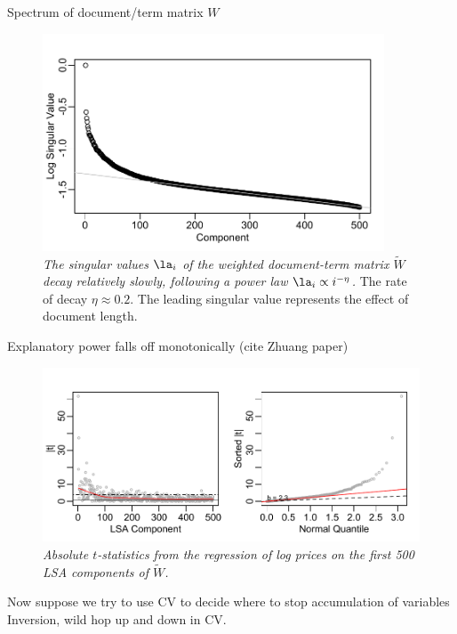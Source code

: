 \documentclass[12pt]{article}
\begin{document}
Spectrum of document/term matrix $W$

 \begin{figure}
 \caption{ 
 	\label{fig:spectrum}
	{\sl The singular values $\la_i$ of the weighted document-term matrix
 $\widetilde{W}$ decay relatively slowly, following a power law $\la_i \propto
 i^{-\eta}$.  } The rate of decay $\eta \approx 0.2$. The leading singular value
 represents the effect of document length. }

 \vspace{0.1in}
 \centerline{   \includegraphics[width=4in]{figures/spectrum} }
 \vspace{0.2in}
 \end{figure}
   

Explanatory power falls off monotonically (cite Zhuang paper)

\begin{figure}
\caption{  \label{fig:lsatstats}  
  {\sl Absolute $t$-statistics from the regression of log prices on the first 500 LSA components of $\widetilde{W}$.}  }
  \centerline{ \includegraphics[width=5in]{figures/lsa_tstats.pdf} }
\end{figure}


Now suppose we try to use CV to decide where to stop accumulation of variables
Inversion, wild hop up and down in CV.
\end{document}
